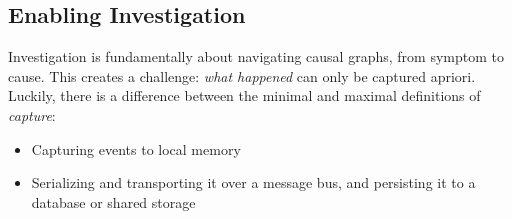 \documentclass[11pt]{article}
\begin{document}
\begin{figure}[h]
  \centering
\end{figure}

\subsection{Enabling Investigation}

Investigation is fundamentally about navigating causal graphs, from symptom to cause.
This creates a challenge: \emph{what happened} can only be captured apriori.
Luckily, there is a difference between the minimal and maximal definitions of \emph{capture}:

\begin{itemize}
  \item Capturing events to local memory
  \item Serializing and transporting it over a message bus, and persisting it to a database or shared storage
\end{itemize}
\end{document}

